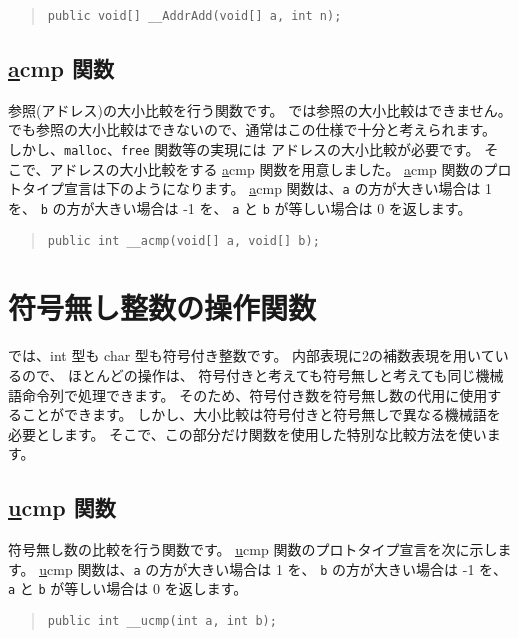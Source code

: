 \begin{quote}
\begin{verbatim}
public void[] __AddrAdd(void[] a, int n);
\end{verbatim}
\end{quote}

\subsection{\ul \ul acmp 関数}

参照(アドレス)の大小比較を行う関数です。
\cmml では参照の大小比較はできません。
\javal でも参照の大小比較はできないので、通常はこの仕様で十分と考えられます。
しかし、\verb/malloc/、\verb/free/ 関数等の実現には
アドレスの大小比較が必要です。
そこで、アドレスの大小比較をする \ul \ul acmp 関数を用意しました。
\ul \ul acmp 関数のプロトタイプ宣言は下のようになります。
\ul \ul acmp 関数は、\verb/a/ の方が大きい場合は 1 を、
\verb/b/ の方が大きい場合は -1 を、
\verb/a/ と \verb/b/ が等しい場合は 0 を返します。

\begin{quote}
\begin{verbatim}
public int __acmp(void[] a, void[] b);
\end{verbatim}
\end{quote}

\section{符号無し整数の操作関数}

\cmml では、int 型も char 型も符号付き整数です。
内部表現に2の補数表現を用いているので、
ほとんどの操作は、
符号付きと考えても符号無しと考えても同じ機械語命令列で処理できます。
そのため、符号付き数を符号無し数の代用に使用することができます。
しかし、大小比較は符号付きと符号無しで異なる機械語を必要とします。
そこで、この部分だけ関数を使用した特別な比較方法を使います。

\subsection{\ul \ul ucmp 関数}

符号無し数の比較を行う関数です。
\ul \ul ucmp 関数のプロトタイプ宣言を次に示します。
\ul \ul ucmp 関数は、\verb/a/ の方が大きい場合は 1 を、
\verb/b/ の方が大きい場合は -1 を、
\verb/a/ と \verb/b/ が等しい場合は 0 を返します。

\begin{quote}
\begin{verbatim}
public int __ucmp(int a, int b);
\end{verbatim}
\end{quote}

